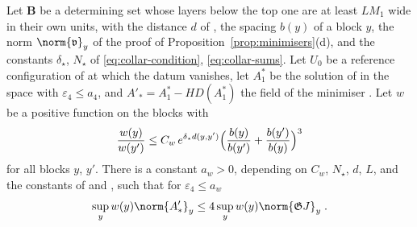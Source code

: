 
\begin{lemma}\label{lem:weighted-minimiser}
Let $\mathbf B$ be a determining set whose layers below the top one are at least $LM_1$ wide in their own units, with the distance $d$ of \cite[(2.46)]{BalabanPRT2}, the spacing $b(y)$ of a block $y$, the norm $\norm{\mathfrak v}_y$ of the proof of Proposition~\ref{prop:minimisers}(d), and the constants $\delta_\star$, $N_\star$ of \eqref{eq:collar-condition}, \eqref{eq:collar-sums}. Let $U_0$ be a reference configuration of \cite[Proposition~5, p.~294]{BalabanVAR} at which the datum \cite[(20)]{BalabanVAR} vanishes, let $A_1^*$ be the solution of \cite[(111)]{BalabanVAR} in the space \cite[(115)]{BalabanVAR} with $\varepsilon_4 \leq a_4$, and $A'_* = A_1^* - HD(A_1^*)$ the field of the minimiser \cite[(112)]{BalabanVAR}. Let $w$ be a positive function on the blocks with
\[
    \frac{w(y)}{w(y')} \leq C_w\,e^{\delta_\star d(y,y')}\Bigl(\frac{b(y)}{b(y')} + \frac{b(y')}{b(y)}\Bigr)^3
\]
for all blocks $y$, $y'$. There is a constant $a_w > 0$, depending on $C_w$, $N_\star$, $d$, $L$, and the constants of \cite[(73), (189)]{BalabanVAR} and \cite[Theorem~3.13]{BalabanPBG}, such that for $\varepsilon_4 \leq a_w$
\[
    \sup_yw(y)\norm{A'_*}_y \leq 4\sup_yw(y)\norm{\mathfrak GJ}_y\;.
\]
\end{lemma}

